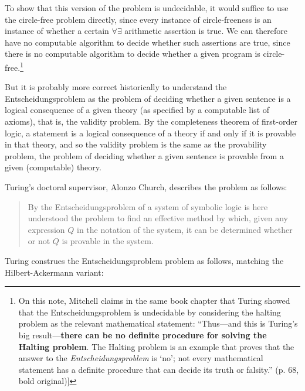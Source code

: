 \documentclass[12pt]{amsart}
\begin{document}
To show that this version of the problem is undecidable, it would suffice to use the circle-free problem directly, since every instance of circle-freeness is an instance of whether a certain $\forall\exists$ arithmetic assertion is true. We can therefore have no computable algorithm to decide whether such assertions are true, since there is no computable algorithm to decide whether a given program is circle-free.\footnote{On this note, Mitchell claims in the same book chapter that Turing showed that the Entscheidungsproblem is undecidable by considering the halting problem as the relevant mathematical statement: \enquote{Thus---and this is Turing's big result---\textbf{there can be no definite procedure for solving the Halting problem}. The Halting problem is an example that proves that the answer to the \textit{Entscheidungsproblem} is \enquote{no}; not every mathematical statement has a definite procedure that can decide its truth or falsity.} (p. 68, bold original)]}

But it is probably more correct historically to understand the Entscheidungsproblem as the problem of deciding whether a given sentence is a logical consequence of a given theory (as specified by a computable list of axioms), that is, the validity problem. By the completeness theorem of first-order logic, a statement is a logical consequence of a theory if and only if it is provable in that theory, and so the validity problem is the same as the provability problem, the problem of deciding whether a given sentence is provable from a given (computable) theory. 

Turing's doctoral supervisor, Alonzo Church, describes the problem as follows:

\begin{quote}\small

By the Entscheidungsproblem of a system of symbolic logic is here understood the problem to find an effective method by which, given any expression $Q$ in the notation of the system, it can be determined whether or not $Q$ is provable in the system. \cite[footnote 6]{church1936note}
    
\end{quote}

Turing construes the Entscheidungsproblem problem as follows, matching the Hilbert-Ackermann variant:
\end{document}
